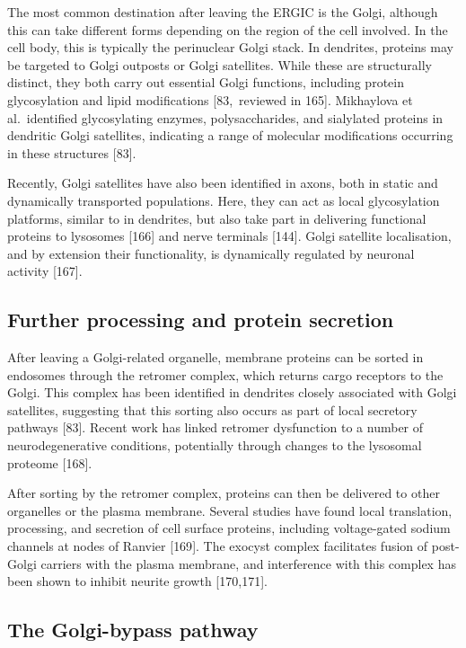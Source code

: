\documentclass[
  12pt,
  a4paper,
]{book}
\begin{document}
The most common destination after leaving the ERGIC is the Golgi, although this can take different forms depending on the region of the cell involved. In the cell body, this is typically the perinuclear Golgi stack. In dendrites, proteins may be targeted to Golgi outposts or Golgi satellites. While these are structurally distinct, they both carry out essential Golgi functions, including protein glycosylation and lipid modifications {[}83,~reviewed in 165{]}. Mikhaylova et al.~identified glycosylating enzymes, polysaccharides, and sialylated proteins in dendritic Golgi satellites, indicating a range of molecular modifications occurring in these structures {[}83{]}.

Recently, Golgi satellites have also been identified in axons, both in static and dynamically transported populations. Here, they can act as local glycosylation platforms, similar to in dendrites, but also take part in delivering functional proteins to lysosomes {[}166{]} and nerve terminals {[}144{]}. Golgi satellite localisation, and by extension their functionality, is dynamically regulated by neuronal activity {[}167{]}.

\hypertarget{further-processing-and-protein-secretion}{%
\subsection{Further processing and protein secretion}\label{further-processing-and-protein-secretion}}

After leaving a Golgi-related organelle, membrane proteins can be sorted in endosomes through the retromer complex, which returns cargo receptors to the Golgi. This complex has been identified in dendrites closely associated with Golgi satellites, suggesting that this sorting also occurs as part of local secretory pathways {[}83{]}. Recent work has linked retromer dysfunction to a number of neurodegenerative conditions, potentially through changes to the lysosomal proteome {[}168{]}.

After sorting by the retromer complex, proteins can then be delivered to other organelles or the plasma membrane. Several studies have found local translation, processing, and secretion of cell surface proteins, including voltage-gated sodium channels at nodes of Ranvier {[}169{]}. The exocyst complex facilitates fusion of post-Golgi carriers with the plasma membrane, and interference with this complex has been shown to inhibit neurite growth {[}170,171{]}.

\hypertarget{Golgi-bypass}{%
\subsection{The Golgi-bypass pathway}\label{Golgi-bypass}}
\end{document}
